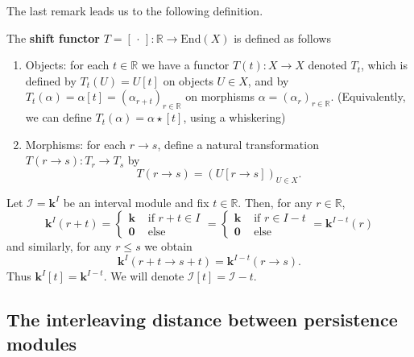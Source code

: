 \documentclass[11pt]{article}
\begin{document}


The last remark leads us to the following definition.

\begin{defi}
The \textbf{shift functor} \(T = [\,\cdot\,]\colon \mathbb{R}\to \mathrm{End}(X)\) 
is defined as follows
\begin{enumerate}[label=(\roman*)]
\item Objects: for each \(t\in \mathbb{R}\) we have a functor  \(T(t) \colon X\to X\) denoted  \(T_t\), which is defined by \(T_t( U) = U[t]\) on objects \(U\in X\), and by \(T_t(\alpha) = \alpha[t] = (\alpha_{r+t})_{r\in \mathbb{R}}\) on morphisms \(\alpha=(\alpha_r)_{r\in \mathbb{R}}\). (Equivalently, we can define \(T_t(\alpha) = \alpha \star [t]\), using a whiskering)
\item Morphisms: for each \(r\to s\), define    a natural transformation $T(r\to s)\colon T_r\to T_s$ by
$$
T(r\to s) = \left( U[r\to s] \right)_{U\in X}.
$$
\end{enumerate}
\end{defi}

\begin{example}\label{ex:shifted.interval.module}
Let \(\mathcal{I}=\mathbf{k}^I\) be an interval module 
and fix \(t\in \mathbb{R}\).
Then, for any \(r\in \mathbb{R}\),
$$
\mathbf{k}^I(r+t) = \begin{cases}
\mathbf{k} &\text{ if }r+t\in I\\
\mathbf{0}&\text{ else }
\end{cases}
= 
\begin{cases}
\mathbf{k} &\text{ if }r \in I-t\\
\mathbf{0}&\text{ else }
\end{cases}
=
\mathbf{k}^{I-t}(r)
$$
and similarly, for any \(r\leq s\) we obtain $$ \mathbf{k}^I(r+t\to s+t) = \mathbf{k}^{I-t}(r\to s).$$
Thus $\mathbf{k}^I[t] =  \mathbf{k}^{I-t}$.
We will denote \(\mathcal{I}[t]=\mathcal{I}-t\).
\end{example}

\subsection{The interleaving distance between persistence modules}
\end{document}
